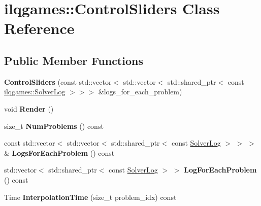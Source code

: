 \hypertarget{classilqgames_1_1_control_sliders}{}\section{ilqgames\+:\+:Control\+Sliders Class Reference}
\label{classilqgames_1_1_control_sliders}
\subsection*{Public Member Functions}
\begin{DoxyCompactItemize}
\item 
{\bfseries Control\+Sliders} (const std\+::vector$<$ std\+::vector$<$ std\+::shared\+\_\+ptr$<$ const \hyperlink{classilqgames_1_1_solver_log}{ilqgames\+::\+Solver\+Log} $>$$>$$>$ \&logs\+\_\+for\+\_\+each\+\_\+problem)\hypertarget{classilqgames_1_1_control_sliders_a87f44ac674d284ac368daca4c1fff949}{}\label{classilqgames_1_1_control_sliders_a87f44ac674d284ac368daca4c1fff949}

\item 
void {\bfseries Render} ()\hypertarget{classilqgames_1_1_control_sliders_a06886eb116592138d8f9340430e4d30d}{}\label{classilqgames_1_1_control_sliders_a06886eb116592138d8f9340430e4d30d}

\item 
size\+\_\+t {\bfseries Num\+Problems} () const \hypertarget{classilqgames_1_1_control_sliders_ae3752e7499e913dc3bbb46e19061cf11}{}\label{classilqgames_1_1_control_sliders_ae3752e7499e913dc3bbb46e19061cf11}

\item 
const std\+::vector$<$ std\+::vector$<$ std\+::shared\+\_\+ptr$<$ const \hyperlink{classilqgames_1_1_solver_log}{Solver\+Log} $>$ $>$ $>$ \& {\bfseries Logs\+For\+Each\+Problem} () const \hypertarget{classilqgames_1_1_control_sliders_a255c57dd31398f88b808fd9bf936b2b1}{}\label{classilqgames_1_1_control_sliders_a255c57dd31398f88b808fd9bf936b2b1}

\item 
std\+::vector$<$ std\+::shared\+\_\+ptr$<$ const \hyperlink{classilqgames_1_1_solver_log}{Solver\+Log} $>$ $>$ {\bfseries Log\+For\+Each\+Problem} () const \hypertarget{classilqgames_1_1_control_sliders_ade4d6dab5db6ca493881c769e2ce9944}{}\label{classilqgames_1_1_control_sliders_ade4d6dab5db6ca493881c769e2ce9944}

\item 
Time {\bfseries Interpolation\+Time} (size\+\_\+t problem\+\_\+idx) const \hypertarget{classilqgames_1_1_control_sliders_a7619ee44e6ce84b5df323a6493338a72}{}\label{classilqgames_1_1_control_sliders_a7619ee44e6ce84b5df323a6493338a72}


\end{DoxyCompactItemize}
